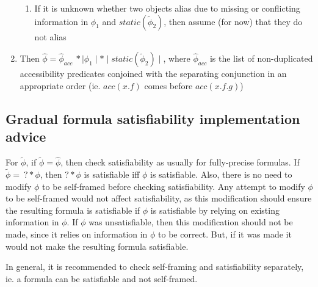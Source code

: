\documentclass {article}
\newcommand{\fphi}{\widehat{\phi}}
\newcommand{\tphi}{\widetilde{\phi}}
\begin{document}
\begin{enumerate}
	\begin{enumerate}
	\item If it is unknown whether two objects alias due to missing or conflicting information in $\phi_1$ and $static(\tphi_2)$, then assume (for now) that they do not alias
	\end{enumerate}
\item Then $\fphi = \fphi_{acc} \ \ast \mid \phi_1 \mid \ast \mid static(\tphi_2) \mid$, where $\fphi_{acc}$ is the list of non-duplicated accessibility predicates conjoined with the separating conjunction in an appropriate order (ie. $acc(x.f)$ comes before $acc(x.f.g)$)
\end{enumerate}

\subsection{Gradual formula satisfiability implementation advice}
For $\tphi$, if $\tphi = \fphi$, then check satisfiability as usually for fully-precise formulas. If $\tphi = \ ? \ast \phi$, then $? \ast \phi$ is satisfiable iff $\phi$ is satisfiable. Also, there is no need to modify $\phi$ to be self-framed before checking satisfiability. Any attempt to modify $\phi$ to be self-framed would not affect satisfiability, as this modification should ensure the resulting formula is satisfiable if $\phi$ is satisfiable by relying on existing information in $\phi$. If $\phi$ was unsatisfiable, then this modification should not be made, since it relies on information in $\phi$ to be correct. But, if it was made it would not make the resulting formula satisfiable.


In general, it is recommended to check self-framing and satisfiability separately, ie. a formula can be satisfiable and not self-framed.
\end{document}
